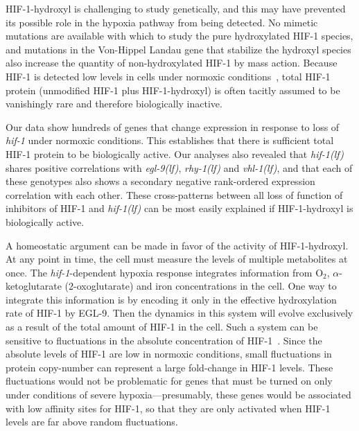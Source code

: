 \documentclass[10pt, onecolumn]{article}
\newcommand{\gene}[1]{\emph{#1}}
\newcommand{\egl}{\emph{\mbox{egl-9}(lf)}}
\newcommand{\rhy}{\emph{\mbox{rhy-1}(lf)}}
\newcommand{\vhl}{\emph{\mbox{vhl-1}(lf)}}
\newcommand{\hif}{\emph{\mbox{hif-1(lf)}}}
\newcommand{\eglp}{EGL-9}
\newcommand{\hifp}{HIF-1}
\begin{document}
\hifp{}-hydroxyl is challenging to study genetically, and this may have prevented
its possible role in the hypoxia pathway from being detected. No mimetic
mutations are available with which to study the pure hydroxylated \hifp{} species,
and mutations in the Von-Hippel Landau gene that stabilize the hydroxyl species
also increase the quantity of non-hydroxylated \hifp{} by mass action. Because
\hifp{} is detected low levels in cells under normoxic conditions~\cite{Wang1993},
total \hifp{} protein (unmodified \hifp{} plus \hifp{}-hydroxyl) is often tacitly
assumed to be vanishingly rare and therefore biologically inactive.

%
Our data show hundreds of genes that change expression in response
to loss of \gene{hif-1} under normoxic conditions. This establishes that there is
sufficient total \hifp{} protein to be biologically active.
Our analyses also revealed that \hif{} shares
positive correlations with \egl{}, \rhy{} and \vhl{}, and that each of these genotypes
also shows a secondary negative rank-ordered expression correlation with each other.
These cross-patterns between all loss of function of inhibitors of \hifp{} and
\hif{} can be most easily explained if \hifp{}-hydroxyl is biologically active.

A homeostatic argument can be made in favor of the activity of \hifp{}-hydroxyl.
At any point in time, the cell must measure the levels of
multiple metabolites at once. The \gene{hif-1}-dependent hypoxia
response integrates information from O$_2$, $\alpha$-ketoglutarate
(2-oxoglutarate) and iron concentrations in the cell. One way to
integrate this information is by encoding it only in the effective hydroxylation
rate of \hifp{} by \eglp{}. Then the dynamics in this system will evolve
exclusively as a result of the total amount of \hifp{} in the cell. Such a system
can be sensitive to fluctuations in the absolute concentration of
\hifp{}~\cite{Goentoro2009a}. Since the absolute levels of \hifp{} are low in
normoxic conditions, small fluctuations in protein copy-number can
represent a large fold-change in \hifp{} levels. These fluctuations would
not be problematic for genes that must be turned on only under conditions of severe
hypoxia---presumably, these genes would be associated with low affinity
sites for \hifp{}, so that they are only activated when \hifp{} levels are far
above random fluctuations.
\end{document}
